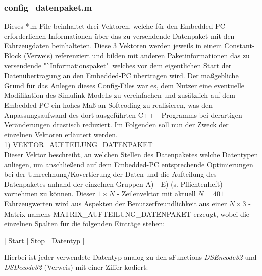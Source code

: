 \documentclass[fontsize = 12pt, paper = a4]{scrreprt}
\begin{document}
\subsubsection{config\_datenpaket.m}

Dieses *.m-File beinhaltet drei Vektoren, welche für den Embedded-PC erforderlichen Informationen über das zu  versendende Datenpaket mit den Fahrzeugdaten beinhalteten. Diese 3 Vektoren werden jeweils in einem Constant-Block (Verweis) referenziert und bilden mit anderen Paketinformationen das zu versendende "`Informationspaket"\, welches vor dem eigentlichen Start der Datenübertragung an den Embedded-PC übertragen wird. Der maßgebliche Grund für das Anlegen dieses Config-Files war es, dem Nutzer eine eventuelle Modifikation des Simulink-Modells zu vereinfachen und zusätzlich auf dem Embedded-PC ein hohes Maß an Softcoding zu realisieren, was den Anpassungsaufwand des dort ausgeführten C++ - Programms bei derartigen Veränderungen drastisch reduziert. Im Folgenden soll nun der Zweck der einzelnen Vektoren erläutert werden. \\

1) VEKTOR\_AUFTEILUNG\_DATENPAKET  \\  

Dieser Vektor beschreibt, an welchen Stellen des Datenpaketes welche Datentypen anliegen, um anschließend auf dem Embedded-PC entsprechende Optimierungen bei der Umrechnung/Kovertierung der Daten und die Aufteilung des Datenpaketes anhand der einzelnen Gruppen A) - E) (s. Pflichtenheft) vornehmen zu können. Dieser $1 \times N$ - Zeilenvektor mit aktuell $N = 401$ Fahrzeugwerten wird aus Aspekten der Benutzerfreundlichkeit aus einer $N \times 3$ - Matrix namens MATRIX\_AUFTEILUNG\_DATENPAKET erzeugt, wobei die einzelnen Spalten für die folgenden Einträge stehen: 

\begin{center}
[ Start | Stop | Datentyp ]
\end{center}

Hierbei ist jeder verwendete Datentyp analog zu den sFunctions \textit{DSEncode32} und \\ \textit{DSDecode32} (Verweis) mit einer Ziffer kodiert:

\vspace*{-3mm}
\end{document}
